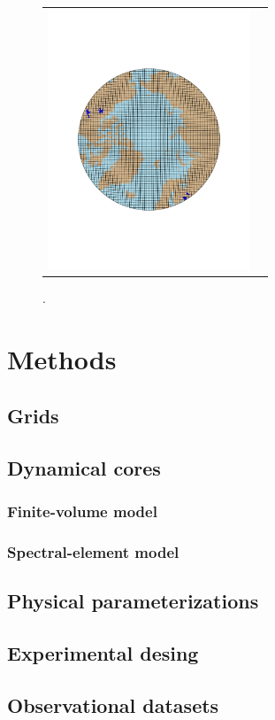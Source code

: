 \documentclass[draft]{agujournal2019}
\begin{document}
\begin{figure}[t]
\begin{center}
\begin{tabular}{cc}
         \includegraphics[width=60mm]{figs/grid-ne30pg3.pdf} \\
\end{tabular}
\end{center}
\caption{.}
\label{fig:uni-grids}
\end{figure}

\section{Methods}\label{sec:methods}
\subsection{Grids}
\subsection{Dynamical cores}
\subsubsection{Finite-volume model}
\subsubsection{Spectral-element model}
\subsection{Physical parameterizations}
\subsection{Experimental desing}
\subsection{Observational datasets}
\end{document}
